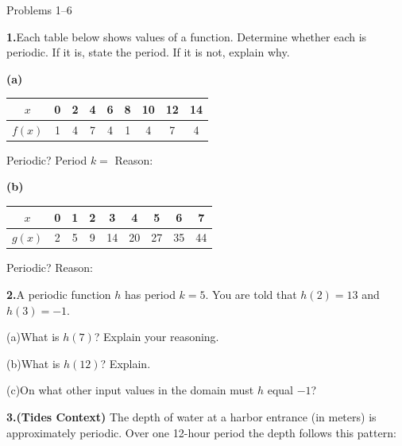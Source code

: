 \documentclass[10pt]{article}
\begin{document}
\namedateperiod

\vspace{0.10in}

\begin{notesbox}{Problems 1--6}

\textbf{1.}\quad Each table below shows values of a function. Determine whether
each is periodic. If it is, state the period. If it is not, explain why.

\vspace{4pt}
\textbf{(a)}
\begin{center}
\renewcommand{\arraystretch}{1.35}
\begin{tabular}{|c|c|c|c|c|c|c|c|c|}
\hline
$x$ & 0 & 2 & 4 & 6 & 8 & 10 & 12 & 14 \\
\hline
$f(x)$ & 1 & 4 & 7 & 4 & 1 & 4 & 7 & 4 \\
\hline
\end{tabular}
\end{center}
Periodic? \underline{\hspace{1.5cm}} \quad Period $k =$ \underline{\hspace{1.5cm}}
\quad Reason: \writeline

\vspace{8pt}
\textbf{(b)}
\begin{center}
\renewcommand{\arraystretch}{1.35}
\begin{tabular}{|c|c|c|c|c|c|c|c|c|}
\hline
$x$ & 0 & 1 & 2 & 3 & 4 & 5 & 6 & 7 \\
\hline
$g(x)$ & 2 & 5 & 9 & 14 & 20 & 27 & 35 & 44 \\
\hline
\end{tabular}
\end{center}
Periodic? \underline{\hspace{1.5cm}} \quad Reason: \writeline

\vspace{0.12in}
\textbf{2.}\quad A periodic function $h$ has period $k = 5$. You are told that
$h(2) = 13$ and $h(3) = -1$.

\vspace{4pt}
(a)\quad What is $h(7)$? Explain your reasoning.

(b)\quad What is $h(12)$? Explain.

(c)\quad On what other input values in the domain must $h$ equal $-1$?

\vspace{0.12in}
\textbf{3.}\quad \textbf{(Tides Context)} The depth of water at a harbor
entrance (in meters) is approximately periodic. Over one 12-hour period the
depth follows this pattern:


\end{notesbox}
\end{document}
